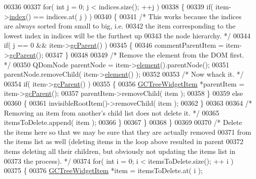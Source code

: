 \begin{DoxyCode}
00336 
00337     \textcolor{keywordflow}{for}( \textcolor{keywordtype}{int} j = 0; j < indices.size(); ++j )
00338     \{
00339       \textcolor{keywordflow}{if}( item->\hyperlink{class_g_c_tree_widget_item_af6b48ae274cc4989811ef44944c8ad76}{index}() == indices.at( j ) )
00340       \{
00341         \textcolor{comment}{/* This works because the indices are always sorted from small to big,
       i.e.}
00342 \textcolor{comment}{          the item corresponding to the lowest index in indices will be the
       furthest up}
00343 \textcolor{comment}{          the node hierarchy. */}
00344         \textcolor{keywordflow}{if}( j == 0 && item->\hyperlink{class_g_c_tree_widget_item_a1125dbc55a8ba3e50662b8258cb35fdf}{gcParent}() )
00345         \{
00346           commentParentItem = item->\hyperlink{class_g_c_tree_widget_item_a1125dbc55a8ba3e50662b8258cb35fdf}{gcParent}();
00347         \}
00348 
00349         \textcolor{comment}{/* Remove the element from the DOM first. */}
00350         QDomNode parentNode = item->\hyperlink{class_g_c_tree_widget_item_a584cad866bdbd94710d31eb77b804d84}{element}().parentNode();
00351         parentNode.removeChild( item->\hyperlink{class_g_c_tree_widget_item_a584cad866bdbd94710d31eb77b804d84}{element}() );
00352 
00353         \textcolor{comment}{/* Now whack it. */}
00354         \textcolor{keywordflow}{if}( item->\hyperlink{class_g_c_tree_widget_item_a1125dbc55a8ba3e50662b8258cb35fdf}{gcParent}() )
00355         \{
00356           \hyperlink{class_g_c_tree_widget_item}{GCTreeWidgetItem} *parentItem = item->\hyperlink{class_g_c_tree_widget_item_a1125dbc55a8ba3e50662b8258cb35fdf}{gcParent}();
00357           parentItem->removeChild( item );
00358         \}
00359         \textcolor{keywordflow}{else}
00360         \{
00361           invisibleRootItem()->removeChild( item );
00362         \}
00363 
00364         \textcolor{comment}{/* Removing an item from another's child list does not delete it. */}
00365         itemsToDelete.append( item );
00366       \}
00367     \}
00368   \}
00369 
00370   \textcolor{comment}{/* Delete the items here so that we may be sure that they are actually
       removed}
00371 \textcolor{comment}{    from the items list as well (deleting items in the loop above resulted in
       parent}
00372 \textcolor{comment}{    items deleting all their children, but obviously not updating the items
       list in}
00373 \textcolor{comment}{    the process). */}
00374   \textcolor{keywordflow}{for}( \textcolor{keywordtype}{int} i = 0; i < itemsToDelete.size(); ++ i )
00375   \{
00376     \hyperlink{class_g_c_tree_widget_item}{GCTreeWidgetItem} *item = itemsToDelete.at( i );

\end{DoxyCode}
